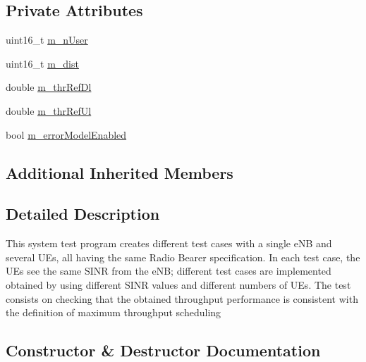 \subsection*{Private Attributes}
\begin{DoxyCompactItemize}
\item 
uint16\+\_\+t \hyperlink{classLenaTdMtFfMacSchedulerTestCase_a6e18eed688f5b1caee075826c8844267}{m\+\_\+n\+User}
\item 
uint16\+\_\+t \hyperlink{classLenaTdMtFfMacSchedulerTestCase_a0aa6a40e725666a870d8c94c21ba156d}{m\+\_\+dist}
\item 
double \hyperlink{classLenaTdMtFfMacSchedulerTestCase_a4f2d6c0e60f9ace0498ae85579f7a8f2}{m\+\_\+thr\+Ref\+Dl}
\item 
double \hyperlink{classLenaTdMtFfMacSchedulerTestCase_a4ee165716b86a7013ed3b44ff014087f}{m\+\_\+thr\+Ref\+Ul}
\item 
bool \hyperlink{classLenaTdMtFfMacSchedulerTestCase_ac304636fee017f49ca3fae7d53701c2d}{m\+\_\+error\+Model\+Enabled}
\end{DoxyCompactItemize}
\subsection*{Additional Inherited Members}


\subsection{Detailed Description}
This system test program creates different test cases with a single e\+NB and several U\+Es, all having the same Radio Bearer specification. In each test case, the U\+Es see the same S\+I\+NR from the e\+NB; different test cases are implemented obtained by using different S\+I\+NR values and different numbers of U\+Es. The test consists on checking that the obtained throughput performance is consistent with the definition of maximum throughput scheduling 

\subsection{Constructor \& Destructor Documentation}
